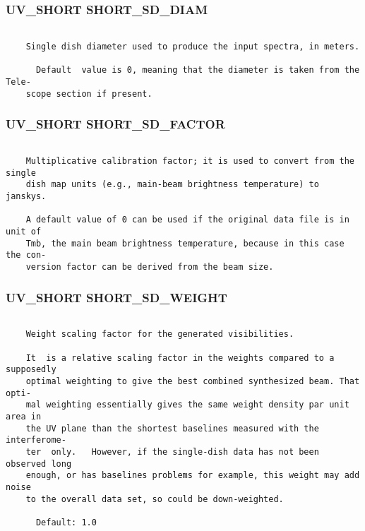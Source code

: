\subsubsection{UV\_SHORT SHORT\_SD\_DIAM}
\begin{verbatim}

    Single dish diameter used to produce the input spectra, in meters.

      Default  value is 0, meaning that the diameter is taken from the Tele-
    scope section if present.

\end{verbatim}
\subsubsection{UV\_SHORT SHORT\_SD\_FACTOR}
\begin{verbatim}

    Multiplicative calibration factor; it is used to convert from the single
    dish map units (e.g., main-beam brightness temperature) to janskys.

    A default value of 0 can be used if the original data file is in unit of
    Tmb, the main beam brightness temperature, because in this case the con-
    version factor can be derived from the beam size.

\end{verbatim}
\subsubsection{UV\_SHORT SHORT\_SD\_WEIGHT}
\begin{verbatim}

    Weight scaling factor for the generated visibilities.

    It  is a relative scaling factor in the weights compared to a supposedly
    optimal weighting to give the best combined synthesized beam. That opti-
    mal weighting essentially gives the same weight density par unit area in
    the UV plane than the shortest baselines measured with the  interferome-
    ter  only.   However, if the single-dish data has not been observed long
    enough, or has baselines problems for example, this weight may add noise
    to the overall data set, so could be down-weighted.

      Default: 1.0

\end{verbatim}
